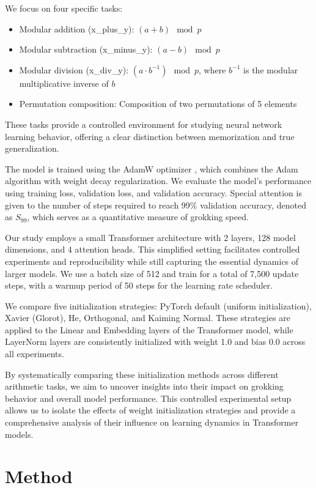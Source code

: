 \documentclass{article} %
\begin{document}
We focus on four specific tasks:
\begin{itemize}
    \item Modular addition (x\_plus\_y): $(a + b) \mod p$
    \item Modular subtraction (x\_minus\_y): $(a - b) \mod p$
    \item Modular division (x\_div\_y): $(a \cdot b^{-1}) \mod p$, where $b^{-1}$ is the modular multiplicative inverse of $b$
    \item Permutation composition: Composition of two permutations of 5 elements
\end{itemize}

These tasks provide a controlled environment for studying neural network learning behavior, offering a clear distinction between memorization and true generalization.

The model is trained using the AdamW optimizer \cite{loshchilov2017adamw}, which combines the Adam algorithm \cite{kingma2014adam} with weight decay regularization. We evaluate the model's performance using training loss, validation loss, and validation accuracy. Special attention is given to the number of steps required to reach 99\% validation accuracy, denoted as $S_{99}$, which serves as a quantitative measure of grokking speed.

Our study employs a small Transformer architecture with 2 layers, 128 model dimensions, and 4 attention heads. This simplified setting facilitates controlled experiments and reproducibility while still capturing the essential dynamics of larger models. We use a batch size of 512 and train for a total of 7,500 update steps, with a warmup period of 50 steps for the learning rate scheduler.

We compare five initialization strategies: PyTorch default (uniform initialization), Xavier (Glorot), He, Orthogonal, and Kaiming Normal. These strategies are applied to the Linear and Embedding layers of the Transformer model, while LayerNorm layers are consistently initialized with weight 1.0 and bias 0.0 across all experiments.

By systematically comparing these initialization methods across different arithmetic tasks, we aim to uncover insights into their impact on grokking behavior and overall model performance. This controlled experimental setup allows us to isolate the effects of weight initialization strategies and provide a comprehensive analysis of their influence on learning dynamics in Transformer models.

\section{Method}
\label{sec:method}
\end{document}
